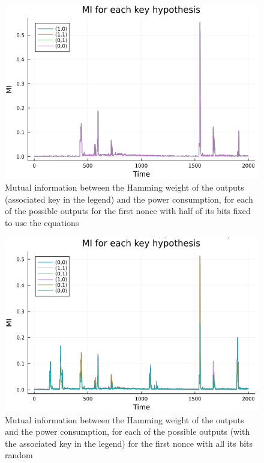 \documentclass[a4paper,11pt,twocolumn]{article}
\begin{document}
	\begin{figure}[h]
		\centering
		\includegraphics[scale=0.4]{nonces_half_fixed}
		\caption{Mutual information between the Hamming weight of the outputs (associated key in the legend) and the power consumption, for each of the possible outputs for the first nonce with half of its bits fixed to use the equations}
		\label{half_fixed}
	\end{figure}
	
	\begin{figure}[h]
		\centering
		\includegraphics[scale=0.4]{nonces_alea}
		\caption{Mutual information between the Hamming weight of the outputs and the power consumption, for each of the possible outputs (with the associated key in the legend) for the first nonce with all its bits random}
		\label{all_alea}
	\end{figure}
	
\end{document}
